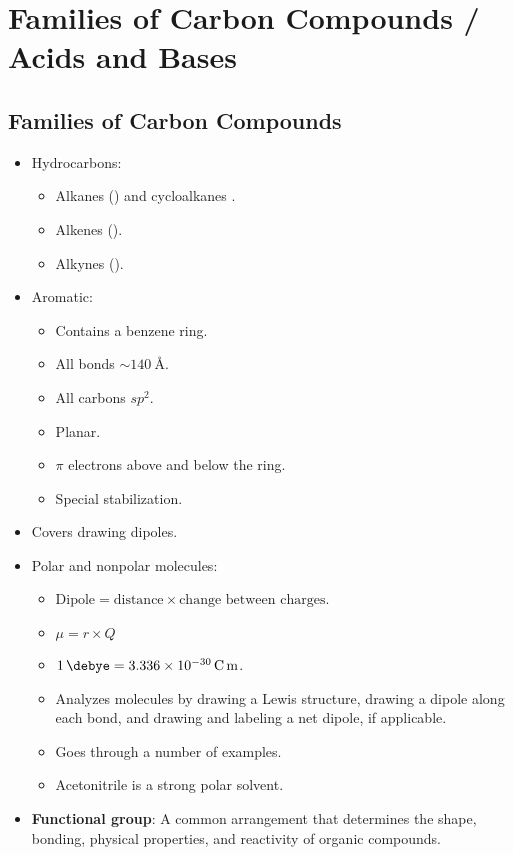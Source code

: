 \documentclass[../notes.tex]{subfiles}
\begin{document}
\chapter{Families of Carbon Compounds / Acids and Bases}
\section{Families of Carbon Compounds}
\begin{itemize}
    \item {}Hydrocarbons:
    \begin{itemize}
        \item Alkanes () and cycloalkanes .
        \item Alkenes ().
        \item Alkynes ().
    \end{itemize}
    \item Aromatic:
    \begin{itemize}
        \item Contains a benzene ring.
        \item All bonds $\sim\SI{140}{\angstrom}$.
        \item All carbons $sp^2$.
        \item Planar.
        \item $\pi$ electrons above and below the ring.
        \item Special stabilization.
    \end{itemize}
    \item Covers drawing dipoles.
    \item Polar and nonpolar molecules:
    \begin{itemize}
        \item $\text{Dipole}=\text{distance}\times\text{change between charges}$.
        \item $\mu=r\times Q$
        \item $\SI{1}{\debye}=\SI{3.336e-30}{\coulomb\meter}$.
        \item Analyzes molecules by drawing a Lewis structure, drawing a dipole along each bond, and drawing and labeling a net dipole, if applicable.
        \item Goes through a number of examples.
        \item Acetonitrile is a strong polar solvent.
    \end{itemize}
    \item \textbf{Functional group}: A common arrangement that determines the shape, bonding, physical properties, and reactivity of organic compounds.

\end{itemize}
\end{document}

